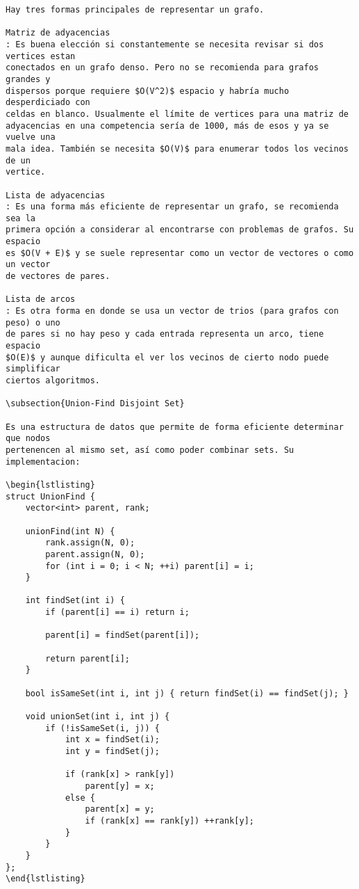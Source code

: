 \documentclass[11pt]{article}
\begin{document}
\begin{verbatim}
Hay tres formas principales de representar un grafo.

Matriz de adyacencias
: Es buena elección si constantemente se necesita revisar si dos vertices estan
conectados en un grafo denso. Pero no se recomienda para grafos grandes y
dispersos porque requiere $O(V^2)$ espacio y habría mucho desperdiciado con
celdas en blanco. Usualmente el límite de vertices para una matriz de
adyacencias en una competencia sería de 1000, más de esos y ya se vuelve una
mala idea. También se necesita $O(V)$ para enumerar todos los vecinos de un
vertice.

Lista de adyacencias
: Es una forma más eficiente de representar un grafo, se recomienda sea la
primera opción a considerar al encontrarse con problemas de grafos. Su espacio
es $O(V + E)$ y se suele representar como un vector de vectores o como un vector
de vectores de pares.

Lista de arcos
: Es otra forma en donde se usa un vector de trios (para grafos con peso) o uno
de pares si no hay peso y cada entrada representa un arco, tiene espacio
$O(E)$ y aunque dificulta el ver los vecinos de cierto nodo puede simplificar
ciertos algoritmos.

\subsection{Union-Find Disjoint Set}

Es una estructura de datos que permite de forma eficiente determinar que nodos
pertenencen al mismo set, así como poder combinar sets. Su implementacion:

\begin{lstlisting}
struct UnionFind {
    vector<int> parent, rank;

    unionFind(int N) {
        rank.assign(N, 0);
        parent.assign(N, 0);
        for (int i = 0; i < N; ++i) parent[i] = i;
    }

    int findSet(int i) {
        if (parent[i] == i) return i;

        parent[i] = findSet(parent[i]);

        return parent[i];
    }

    bool isSameSet(int i, int j) { return findSet(i) == findSet(j); }

    void unionSet(int i, int j) {
        if (!isSameSet(i, j)) {
            int x = findSet(i);
            int y = findSet(j);

            if (rank[x] > rank[y])
                parent[y] = x;
            else {
                parent[x] = y;
                if (rank[x] == rank[y]) ++rank[y];
            }
        }
    }
};
\end{lstlisting}


\end{verbatim}
\end{document}
